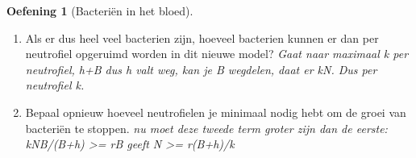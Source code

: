 \documentclass[
  a4paper,
]{scrbook}
\theoremstyle{definition}
\newtheorem{exercise}{Oefening}[chapter]
\theoremstyle{remark}
\begin{document}
\begin{exercise}[Bacteriën in het
bloed]
\begin{enumerate}
  \[\mathchoice{\frac{\mathrm{d}B}
  {\mathrm{d}t}}{\mathrm{d}B/\mathrm{d}t}
  {\mathrm{d}B/\mathrm{d}t}
  {\mathrm{d}B/\mathrm{d}t}=rB-\frac{kNB}{h+B}  \] De vernieuwde
  (tweede) term ziet er misschien wat ingewikkeld uit. Om te begrijpen
  wat er gebeurt is het wederom handig om even na tegaan wat er gebeurt
  met 0 of heel veel bacterien. Als er 0 bacterien zijn is deze term 0,
  omdat boven de breuk een \(B\) staat. Als \(B\) heel groot is, hoe
  belangrijk is \(h\) dan nog in deze vergelijking? \emph{niet heel
  belangrijk meer, uiteindelijk `verwaarloosbaar'}
\item
  Als er dus heel veel bacterien zijn, hoeveel bacterien kunnen er dan
  per neutrofiel opgeruimd worden in dit nieuwe model? \emph{Gaat naar
  maximaal k per neutrofiel, h+B dus h valt weg, kan je B wegdelen, daat
  er kN. Dus per neutrofiel k.}
\item
  Bepaal opnieuw hoeveel neutrofielen je minimaal nodig hebt om de groei
  van bacteriën te stoppen. \emph{nu moet deze tweede term groter zijn
  dan de eerste: kNB/(B+h) \textgreater= rB geeft N \textgreater=
  r(B+h)/k}
\end{enumerate}

\end{exercise}
\end{document}
